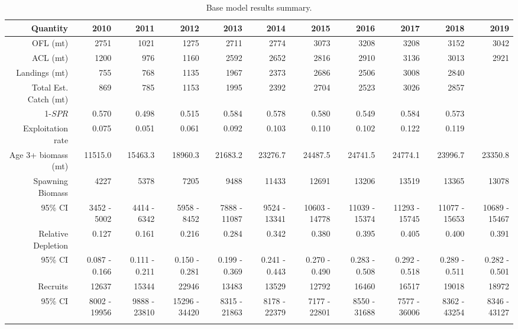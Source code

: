 \documentclass[12pt,]{article}
\begin{document}
\begin{landscape}
\begingroup\fontsize{8pt}{9pt}\selectfont
\begin{longtable}{rrrrrrrrrrr}
\caption{Base model results summary.} \\ 
  \hline
Quantity & 2010 & 2011 & 2012 & 2013 & 2014 & 2015 & 2016 & 2017 & 2018 & 2019 \\ 
  \hline
OFL (mt) & 2751 & 1021 & 1275 & 2711 & 2774 & 3073 & 3208 & 3208 & 3152 & 3042 \\ 
  ACL (mt) & 1200 &  976 & 1160 & 2592 & 2652 & 2816 & 2910 & 3136 & 3013 & 2921 \\ 
  Landings (mt) &  755 &  768 & 1135 & 1967 & 2373 & 2686 & 2506 & 3008 & 2840 &  \\ 
  Total Est. Catch (mt) &  869 &  785 & 1153 & 1995 & 2392 & 2704 & 2523 & 3026 & 2857 &  \\ 
  1-$SPR$ & 0.570 & 0.498 & 0.515 & 0.584 & 0.578 & 0.580 & 0.549 & 0.584 & 0.573 &  \\ 
  Exploitation rate & 0.075 & 0.051 & 0.061 & 0.092 & 0.103 & 0.110 & 0.102 & 0.122 & 0.119 &  \\ 
  Age 3+ biomass (mt) & 11515.0 & 15463.3 & 18960.3 & 21683.2 & 23276.7 & 24487.5 & 24741.5 & 24774.1 & 23996.7 & 23350.8 \\ 
  Spawning Biomass &  4227 &  5378 &  7205 &  9488 & 11433 & 12691 & 13206 & 13519 & 13365 & 13078 \\ 
  ~95\% CI & 3452 - 5002 & 4414 - 6342 & 5958 - 8452 & 7888 - 11087 & 9524 - 13341 & 10603 - 14778 & 11039 - 15374 & 11293 - 15745 & 11077 - 15653 & 10689 - 15467 \\ 
  Relative Depletion & 0.127 & 0.161 & 0.216 & 0.284 & 0.342 & 0.380 & 0.395 & 0.405 & 0.400 & 0.391 \\ 
  ~95\% CI & 0.087 - 0.166 & 0.111 - 0.211 & 0.150 - 0.281 & 0.199 - 0.369 & 0.241 - 0.443 & 0.270 - 0.490 & 0.283 - 0.508 & 0.292 - 0.518 & 0.289 - 0.511 & 0.282 - 0.501 \\ 
  Recruits & 12637 & 15344 & 22946 & 13483 & 13529 & 12792 & 16460 & 16517 & 19018 & 18972 \\ 
  ~95\% CI & 8002 - 19956 & 9888 - 23810 & 15296 - 34420 & 8315 - 21863 & 8178 - 22379 & 7177 - 22801 & 8550 - 31688 & 7577 - 36006 & 8362 - 43254 & 8346 - 43127 \\ 
   \hline
\hline
\label{tab:base_summary}
\end{longtable}
\endgroup
\end{landscape}

\FloatBarrier
\end{document}
